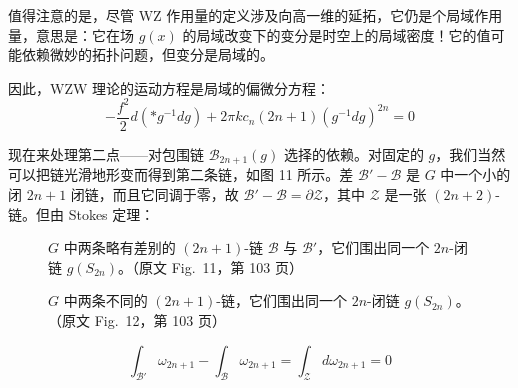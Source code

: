值得注意的是，尽管 WZ 作用量的定义涉及向高一维的延拓，它仍是个局域作用量，意思是：它在场 $g(x)$ 的局域改变下的变分是时空上的局域密度！它的值可能依赖微妙的拓扑问题，但变分是局域的。

因此，WZW 理论的运动方程是局域的偏微分方程：
\begin{equation}
  -\frac{f^2}{2}d(*g^{-1}dg)+2\pi kc_n(2n+1)(g^{-1}dg)^{2n}=0
  \tag{4.8}
  \label{eq:4.8}
\end{equation}


现在来处理第二点——对包围链 $\mathcal{B}_{2n+1}(g)$ 选择的依赖。对固定的 $g$，我们当然可以把链光滑地形变而得到第二条链，如图 11 所示。差 $\mathcal{B}'-\mathcal{B}$ 是 $G$ 中一个小的闭 $2n+1$ 闭链，而且它同调于零，故 $\mathcal{B}'-\mathcal{B}=\partial\mathcal{Z}$，其中 $\mathcal{Z}$ 是一张 $(2n+2)$-链。但由 Stokes 定理：

\begin{figure}[htbp]
  \centering
  \MissingFigureNote
  \caption{$G$ 中两条略有差别的 $(2n+1)$-链 $\mathcal{B}$ 与 $\mathcal{B}'$，它们围出同一个 $2n$-闭链 $g(S_{2n})$。（原文 Fig.~11，第 103 页）}
  \label{fig:11}
\end{figure}

\begin{figure}[htbp]
  \centering
  \MissingFigureNote
  \caption{$G$ 中两条不同的 $(2n+1)$-链，它们围出同一个 $2n$-闭链 $g(S_{2n})$。（原文 Fig.~12，第 103 页）}
  \label{fig:12}
\end{figure}

\begin{equation}
  \int_{\mathcal{B}'}\omega_{2n+1}-\int_{\mathcal{B}}\omega_{2n+1}=\int_{\mathcal{Z}}d\omega_{2n+1}=0
  \tag{4.9}
  \label{eq:4.9}
\end{equation}

